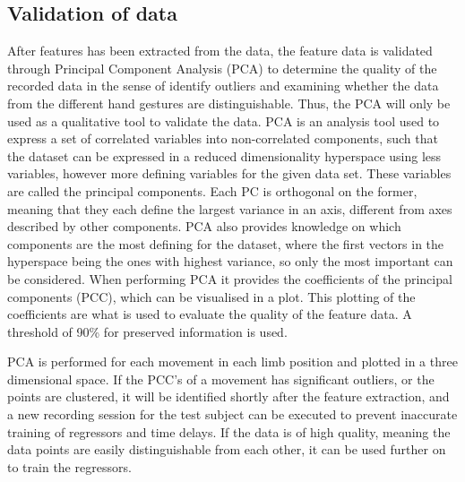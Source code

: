 \subsection{Validation of data}


After features has been extracted from the data, the feature data is validated through Principal Component Analysis (PCA) to determine the quality of the recorded data in the sense of identify outliers and examining whether the data from the different hand gestures are distinguishable. Thus, the PCA will only be used as a qualitative tool to validate the data. %
PCA is an analysis tool used to express a set of correlated variables into non-correlated components, such that the dataset can be expressed in a reduced dimensionality hyperspace using less variables, however more defining variables for the given data set. These variables are called the principal components. Each PC is orthogonal on the former, meaning that they each define the largest variance in an axis, different from axes described by other components. PCA also provides knowledge on which components are the most defining for the dataset, where the first vectors in the hyperspace being the ones with highest variance, so only the most important can be considered. When performing PCA it provides the coefficients of the principal components (PCC), which can be visualised in a plot. This plotting of the coefficients are what is used to evaluate the quality of the feature data. A threshold of 90\% for preserved information is used. 

PCA is performed for each movement in each limb position and plotted in a three dimensional space. If the PCC's of a movement has significant outliers, or the points are clustered, it will be identified shortly after the feature extraction, and a new recording session for the test subject can be executed to prevent inaccurate training of regressors and time delays. If the data is of high quality, meaning the data points are easily distinguishable from each other, it can be used further on to train the regressors.

